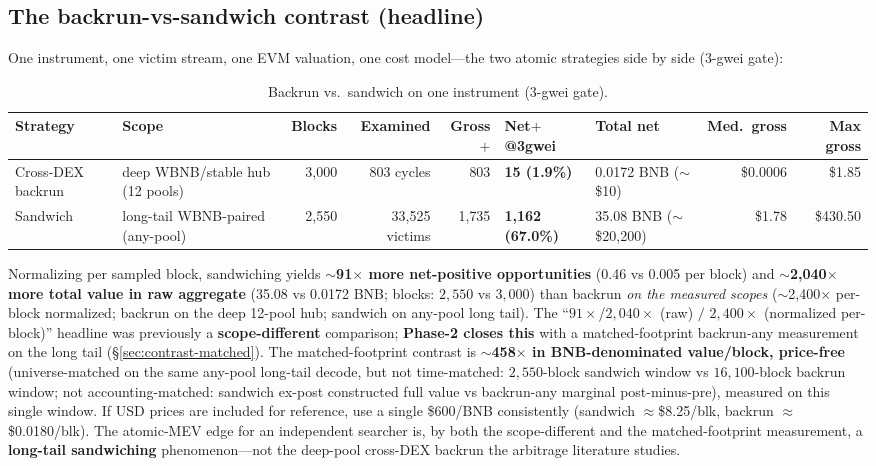 \documentclass[11pt]{article}
\begin{document}
\subsection{The backrun-vs-sandwich contrast (headline)}
\label{sec:contrast}
One instrument, one victim stream, one EVM valuation, one cost model---the two atomic
strategies side by side (3-gwei gate):
\begin{table}[h]\centering
\caption{Backrun vs.\ sandwich on one instrument (3-gwei gate).}\label{tab:contrast}
\small
\begin{tabular}{p{2.0cm}p{2.0cm}rrrp{1.5cm}p{1.8cm}rr}
\toprule
Strategy & Scope & Blocks & Examined & Gross$+$ & Net$+$ @3gwei & Total net &
  Med.\ gross & Max gross \\
\midrule
Cross-DEX backrun & deep WBNB/stable hub (12 pools) & 3{,}000 & 803 cycles & 803 &
  \textbf{15 (1.9\%)} & 0.0172 BNB ($\sim$\$10) & \$0.0006 & \$1.85 \\
Sandwich & long-tail WBNB-paired (any-pool) & 2{,}550 & 33{,}525 victims & 1{,}735 &
  \textbf{1{,}162 (67.0\%)} & 35.08 BNB ($\sim$\$20{,}200) & \$1.78 & \$430.50 \\
\bottomrule
\end{tabular}
\end{table}

\noindent Normalizing per sampled block, sandwiching yields \textbf{$\sim$91$\times$
more net-positive opportunities} (0.46 vs 0.005 per block) and \textbf{$\sim$2{,}040$\times$
more total value in raw aggregate} (35.08 vs 0.0172 BNB; blocks: $2{,}550$ vs $3{,}000$)
than backrun \emph{on the measured scopes} ($\sim$2{,}400$\times$ per-block normalized;
backrun on the deep 12-pool hub; sandwich on any-pool long tail). The
``$91\times$/$2{,}040\times$ (raw) $/$ $2{,}400\times$ (normalized per-block)'' headline was previously a
\textbf{scope-different} comparison; \textbf{Phase-2 closes this} with a
matched-footprint backrun-any measurement on the long tail
(\S\ref{sec:contrast-matched}). The matched-footprint contrast is
\textbf{$\sim$458$\times$ in BNB-denominated value/block, price-free} (universe-matched
on the same any-pool long-tail decode, but not time-matched: $2{,}550$-block sandwich
window vs $16{,}100$-block backrun window; not accounting-matched: sandwich ex-post
constructed full value vs backrun-any marginal post-minus-pre), measured on this single
window. If USD prices are included for reference, use a single \$600/BNB consistently
(sandwich $\approx$\$8.25/blk, backrun $\approx$\$0.0180/blk). The atomic-MEV edge for an independent
searcher is, by both the scope-different and the matched-footprint measurement, a
\textbf{long-tail sandwiching} phenomenon---not the deep-pool cross-DEX backrun the
arbitrage literature studies.
\end{document}
